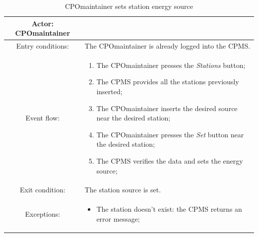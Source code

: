 \begin{table}[h]
    \begin{center}
        \begin{tabular}{|c||p{10cm}|}
            \hline
            Actor: \ac{CPO}maintainer &                                                              \\
            \hline
            Entry conditions:         & The \ac{CPO}maintainer is already logged into the \ac{CPMS}. \\
            \hline
            Event flow:               &
            \begin{enumerate}
                \item The \ac{CPO}maintainer presses the \textit{Stations} button;
                \item The \ac{CPMS} provides all the stations previously inserted;
                \item The \ac{CPO}maintainer inserts the desired source near the desired station;
                \item The \ac{CPO}maintainer presses the \textit{Set} button near the desired station;
                \item The \ac{CPMS} verifies the data and sets the energy source;
            \end{enumerate}
            \\
            \hline
            Exit condition:           & The station source is set.                                   \\
            \hline
            Exceptions:               &
            \begin{itemize}
                \item The station doesn't exist: the \ac{CPMS} returns an error message;
            \end{itemize}
            \\
            \hline
        \end{tabular}
    \end{center}
    \caption{\ac{CPO}maintainer sets station energy source}
\end{table}

\clearpage
